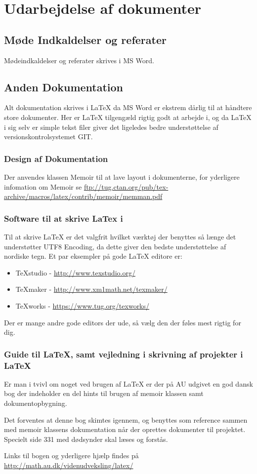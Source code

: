 \chapter{Udarbejdelse af dokumenter}

\section{Møde Indkaldelser og referater}
Mødeindkaldelser og referater skrives i MS Word.

\section{Anden Dokumentation}
Alt dokumentation skrives i LaTeX da MS Word er ekstrem dårlig til at håndtere store dokumenter. Her er LaTeX tilgengæld rigtig godt at arbejde i, og da LaTeX i sig selv er simple tekst filer giver det ligeledes bedre understøttelse af versionskontrolsystemet GIT.
\subsection{Design af Dokumentation}
Der anvendes klassen Memoir til at lave layout i dokumenterne, for yderligere infomation om Memoir se \url{ftp://tug.ctan.org/pub/tex-archive/macros/latex/contrib/memoir/memman.pdf}
\subsection{Software til at skrive LaTex i}
Til at skrive LaTeX er det valgfrit hvilket værktøj der benyttes så længe det understøtter UTF8 Encoding, da dette giver den bedste understøttelse af nordiske tegn.
Et par eksempler på gode LaTeX editore er:

\begin{itemize}
	\item TeXstudio - \url{http://www.texstudio.org/}
	\item TeXmaker - \url{http://www.xm1math.net/texmaker/}
	\item TeXworks - \url{https://www.tug.org/texworks/}
\end{itemize}
Der er mange andre gode editors der ude, så vælg den der føles mest rigtig for dig.

\subsection{Guide til LaTeX, samt vejledning i skrivning af projekter i LaTeX}
Er man i tvivl om noget ved brugen af LaTeX er der på AU udgivet en god dansk bog der indeholder en del hints til brugen af memoir klassen samt dokumentopbygning.

Det forventes at denne bog skimtes igennem, og benyttes som reference sammen med memoir klassens dokumentation når der oprettes dokumenter til projektet.
Specielt side 331 med dødsynder skal læses og forstås.

Links til bogen og yderligere hjælp findes på \url{http://math.au.dk/videnudveksling/latex/}